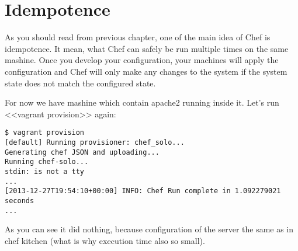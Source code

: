 \section{Idempotence}

As you should read from previous chapter, one of the main idea of Chef is idempotence. It mean, what Chef can safely be run multiple times on the same mashine. Once you develop your configuration, your machines will apply the configuration and Chef will only make any changes to the system if the system state does not match the configured state.

For now we have mashine which contain apache2 running inside it. Let's run <<vagrant provision>> again:

\begin{lstlisting}[label=lst:my-cloud-idempotence1]
$ vagrant provision
[default] Running provisioner: chef_solo...
Generating chef JSON and uploading...
Running chef-solo...
stdin: is not a tty
...
[2013-12-27T19:54:10+00:00] INFO: Chef Run complete in 1.092279021 seconds
...
\end{lstlisting}

As you can see it did nothing, because configuration of the server the same as in chef kitchen (what is why execution time also so small).
